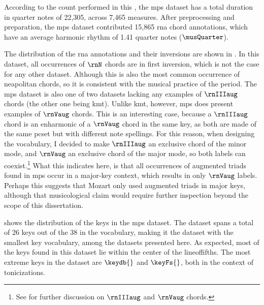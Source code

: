 
According to the count performed in this \thesisdiss{}, the
\gls{mps} dataset has a total duration in quarter notes of
22,305, across 7,465 measures. After preprocessing and
preparation, the \gls{mps} dataset contributed 15,865
\gls{rna} chord annotations, which have an average harmonic
rhythm of 1.41 quarter notes ($\musQuarter$).

The distribution of the \gls{rna} annotations and their
inversions are shown in . In this
dataset, all occurrences of $\rnN$ chords are in first
inversion, which is not the case for any other dataset.
Although this is also the most common occurrence of
\gls{neapolitan} chords, so it is consistent with the
musical practice of the period. The \gls{mps} dataset is
also one of two datasets lacking any examples of $\rnIIIaug$
chords (the other one being \gls{kmt}). Unlike \gls{kmt},
however, \gls{mps} does present examples of $\rnVaug$
chords. This is an interesting case, because a $\rnIIIaug$
chord is an enharmonic of a $\rnVaug$ chord in the same key,
as both are made of the same \gls{pcset} but with different
note spellings. For this reason, when designing the
vocabulary, I decided to make $\rnIIIaug$ an exclusive chord
of the minor mode, and $\rnVaug$ an exclusive chord of the
major mode, so both labels can coexist.\footnote{See
 for
further discussion on $\rnIIIaug$ and $\rnVaug$ chords.}
What this indicates here, is that all occurrences of
augmented triads found in \gls{mps} occur in a major-key
context, which results in only $\rnVaug$ labels. Perhaps
this suggests that Mozart only used augmented triads in
major keys, although that musicological claim would require
further inspection beyond the scope of this dissertation.



 shows the distribution of the keys
in the \gls{mps} dataset. The dataset spans a total of 26
keys out of the 38 in the vocabulary, making it the dataset
with the smallest key vocabulary, among the datasets
presented here. As expected, most of the keys found in this
dataset lie within the center of the \gls{lineoffifths}. The
most extreme keys in the dataset are $\keydb{}$ and $\keyFs{}$,
both in the context of tonicizations.
